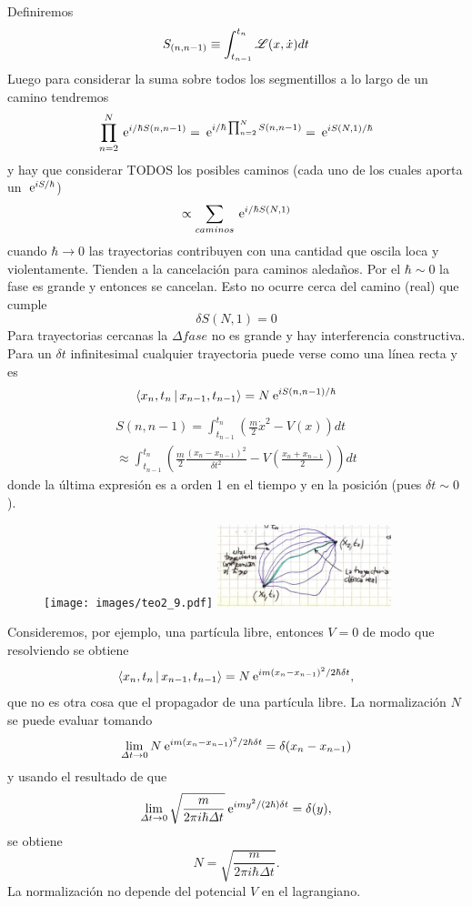 \documentclass[10pt,oneside]{CBFT_book}
\begin{document}
Definiremos
\[
	S_{(n,n-1)}\equiv \int_{t_{n-1}}^{t_n}\mathscr{L}(x,\dot{x}) dt
\]
Luego para considerar la suma sobre todos los segmentillos a lo largo de un camino tendremos
\[
	\prod_{n=2}^N \:\mathrm{e}^{i/\hbar S(n,n-1)} = \:\mathrm{e}^{i/\hbar \prod_{n=2}^N S(n,n-1)} = \:\mathrm{e}^{iS(N,1)/\hbar}
\]
y hay que considerar TODOS los posibles caminos (cada uno de los cuales aporta un $\:\mathrm{e}^{iS/\hbar}$) 
\[
	\propto \sum_{caminos} \:\mathrm{e}^{i/\hbar S(N,1)} 
\]
cuando $\hbar \to 0$ las trayectorias contribuyen con una cantidad que oscila loca y violentamente. 
Tienden a la cancelación para caminos aledaños. Por el $\hbar \sim 0$ la fase es grande y entonces
se cancelan. Esto no ocurre cerca del camino (real) que cumple 
\[
	\delta S(N,1) = 0
\]
Para trayectorias cercanas la $\Delta fase$ no es grande y hay interferencia constructiva.
Para un $\delta t$ infinitesimal cualquier trayectoria puede verse como una línea recta y es 
\[
	\Braket{x_n,t_n|x_{n-1},t_{n-1}} = N \:\mathrm{e}^{iS(n,n-1)/\hbar}
\]
\begin{multline*}
	S(n,n-1) = \int_{t_{n-1}}^{t_n} \left( \frac{m}{2}\dot{x}^2 - V(x)\right) dt \\ 
	\approx \int_{t_{n-1}}^{t_n} \left( \frac{m}{2} \frac{(x_n-x_{n-1})^2}{\delta t^2} - 
	V\left(\frac{x_n+x_{n-1}}{2}\right)\right)  dt 
\end{multline*}
donde la última expresión es a orden 1 en el tiempo y en la posición (pues $\delta t \sim 0$).
\begin{figure}[htb]
	\begin{center}
	\texttt{[image: images/teo2\_9.pdf]}
	\includegraphics[width=0.45\textwidth]{images/fig_ft2_feynmann_path_int_2.jpg}
	\end{center}
	\caption{}
\end{figure} 

Consideremos, por ejemplo, una partícula libre, entonces $V=0$ de modo que resolviendo 
se obtiene
\[
	\Braket{x_n,t_n|x_{n-1},t_{n-1}} = N \:\mathrm{e}^{i m (x_n - x_{n-1})^2/2\hbar\delta t},
\]
que no es otra cosa que el propagador de una partícula libre. La normalización $N$ se puede
evaluar tomando
\[
	\lim_{\Delta t \to 0} N \:\mathrm{e}^{i m (x_n - x_{n-1})^2/2\hbar\delta t} = \delta( x_n - x_{n-1} )
\]
y usando el resultado de que
\[
	\lim_{\Delta t \to 0} \sqrt{\frac{m}{2\pi i \hbar \Delta t}}
	\:\mathrm{e}^{ i m y^2/(2\hbar) \delta t} = \delta(y),
\]
se obtiene
\[
	N = \sqrt{\frac{m}{2\pi i \hbar \Delta t}}.
\]
La normalización no depende del potencial $V$ en el lagrangiano.
\end{document}
